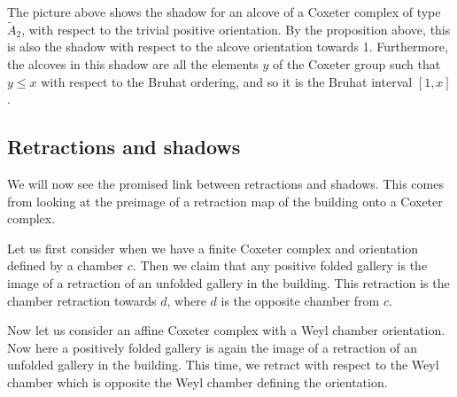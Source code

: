 \documentclass[11pt]{article}
\begin{document}
\begin{example}
    The picture above shows the shadow for an alcove of a Coxeter complex of type $\tilde{A}_2$, with respect to the trivial positive orientation. By the proposition above, this is also the shadow with respect to the alcove orientation towards 1. Furthermore, the alcoves in this shadow are all the elements $y$ of the Coxeter group such that $y\leq x$ with respect to the Bruhat ordering, and so it is the Bruhat interval $[1,x]$. 
\end{example}

\subsection{Retractions and shadows}\label{retract}
We will now see the promised link between retractions and shadows. This comes from looking at the preimage of a retraction map of the building onto a Coxeter complex. 




    



Let us first consider when we have a finite Coxeter complex and orientation defined by a chamber $c$. Then we claim that any positive folded gallery is the image of a retraction of an unfolded gallery in the building. This retraction is the chamber retraction towards $d$, where $d$ is the opposite chamber from $c$. 


Now let us consider an affine Coxeter complex with a Weyl chamber orientation. Now here a positively folded gallery is again the image of a retraction of an unfolded gallery in the building. This time, we retract with respect to the Weyl chamber which is opposite the Weyl chamber defining the orientation.
\end{document}
